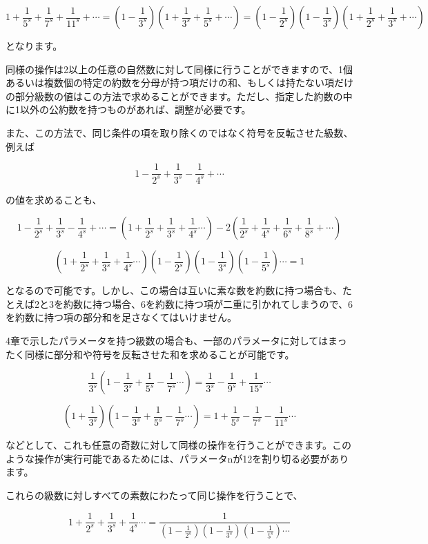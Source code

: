 \documentclass[./main]{subfiles}
\theoremstyle{break}
\begin{document}
\[1+\frac{1}{5^s}+\frac{1}{7^s}+\frac{1}{11^s}+\cdots=\left( 1-\frac{1}{3^s} \right)\left( 1+\frac{1}{3^s}+\frac{1}{5^s}+\cdots \right)=\left( 1-\frac{1}{2^s} \right)\left( 1-\frac{1}{3^s} \right)\left( 1+\frac{1}{2^s}+\frac{1}{3^s}+\cdots \right)\]

となります。

同様の操作は2以上の任意の自然数に対して同様に行うことができますので、1個あるいは複数個の特定の約数を分母が持つ項だけの和、もしくは持たない項だけの部分級数の値はこの方法で求めることができます。ただし、指定した約数の中に1以外の公約数を持つものがあれば、調整が必要です。

また、この方法で、同じ条件の項を取り除くのではなく符号を反転させた級数、例えば

\[1-\frac{1}{2^s}+\frac{1}{3^s}-\frac{1}{4^s}+\cdots\]

の値を求めることも、

\[1-\frac{1}{2^s}+\frac{1}{3^s}-\frac{1}{4^s}+\cdots= \left(1+\frac{1}{2^s}+\frac{1}{3^s}+\frac{1}{4^s}\cdots \right)-2\left(\frac{1}{2^s}+\frac{1}{4^s}+\frac{1}{6^s}+\frac{1}{8^s}+\cdots \right)\]

\[\left( 1+\frac{1}{2^s}+\frac{1}{3^s}+\frac{1}{4^s}\cdots \right)\left( 1-\frac{1}{2^s} \right)\left( 1-\frac{1}{3^s} \right)\left( 1-\frac{1}{5^s} \right)\cdots=1\]

となるので可能です。しかし、この場合は互いに素な数を約数に持つ場合も、たとえば2と3を約数に持つ場合、6を約数に持つ項が二重に引かれてしまうので、6を約数に持つ項の部分和を足さなくてはいけません。

4章で示したパラメータを持つ級数の場合も、一部のパラメータに対してはまったく同様に部分和や符号を反転させた和を求めることが可能です。

\[\frac{1}{3^s}\left(1-\frac{1}{3^s}+\frac{1}{5^s}-\frac{1}{7^s}\cdots\right)=\frac{1}{3^s}-\frac{1}{9^s}+\frac{1}{15^s}\cdots\]

\[\left( 1+\frac{1}{3^s} \right)\left( 1-\frac{1}{3^s}+\frac{1}{5^s}-\frac{1}{7^s}\cdots \right)=1+\frac{1}{5^s}-\frac{1}{7^s}-\frac{1}{11^s}\cdots\]

などとして、これも任意の奇数に対して同様の操作を行うことができます。このような操作が実行可能であるためには、パラメータnが12を割り切る必要があります。

これらの級数に対しすべての素数にわたって同じ操作を行うことで、

\[1+\frac{1}{2^s}+\frac{1}{3^s}+\frac{1}{4^s}\cdots =\frac{1}{\left( 1-\frac{1}{2^s} \right)\left( 1-\frac{1}{3^s} \right)\left( 1-\frac{1}{5^s} \right)\cdots}\]
\end{document}

